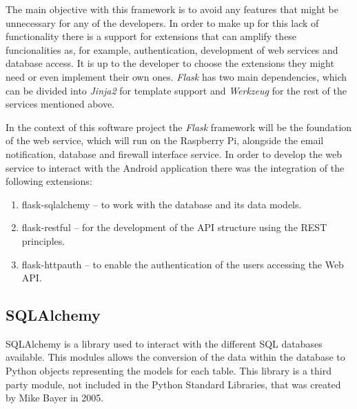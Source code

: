 The main objective with this framework is to avoid any features that might be
unnecessary for any of the developers. In order to make up for this lack of
functionality there is a support for extensions that can amplify these
funcionalities as, for example, authentication, development of web services and
database access. It is up to the developer to choose the extensions they might
need or even implement their own ones.
\emph{Flask} has two main dependencies, which can be divided into \emph{Jinja2} for
template support and \emph{Werkzeug} for the rest of the services mentioned
above.

In the context of this software project the \emph{Flask} framework will be the
foundation of the web service, which will run on the Raspberry Pi, alongside the
email notification, database and firewall interface service. In order to develop
the web service to interact with the Android application there was the
integration of the following extensions:
\begin{enumerate}
	\item flask-sqlalchemy -- to work with the database and its data models.
	\item flask-restful -- for the development of the API structure using the
		REST principles.
	\item flask-httpauth -- to enable the authentication of the users accessing
		the Web API.
\end{enumerate}



\subsection{SQLAlchemy}
\label{chap3:sec:tools:sub:sqlalcemy}
SQLAlchemy is a library used to interact with the different SQL databases
available. This modules allows the conversion of the data within the database to
Python objects representing the models for each table. This library is a third
party module, not included in the Python Standard Libraries, that was created by
Mike Bayer in 2005.

